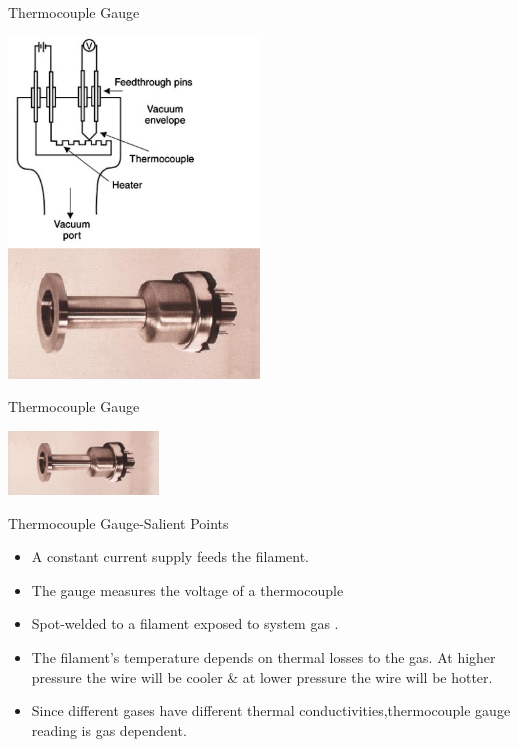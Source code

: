 \documentclass[11pt]{beamer}
\begin{document}
\begin{frame}{Thermocouple Gauge}
\begin{center}
\includegraphics[width=0.5\textwidth]{Thermocouple.png}
\end{center}

	
	

\end{frame}

\begin{frame}{Thermocouple Gauge}

\begin{center}
\includegraphics[width=0.3\textwidth]{tc.png}
\end{center}
\begin{block}{Thermocouple Gauge-Salient Points}
      
        \begin{itemize}
          \item A constant current supply feeds the filament.
          \item The gauge measures the voltage of a thermocouple
          \item Spot-welded to a filament exposed to system gas . 
          \item The filament's temperature depends on thermal losses to the gas. At higher pressure the wire will be cooler \& at lower pressure the wire will be hotter.
          \item Since different gases have different thermal conductivities,thermocouple gauge reading is gas dependent.
        \end{itemize}
	
	\end{block}

\end{frame}
\end{document}
